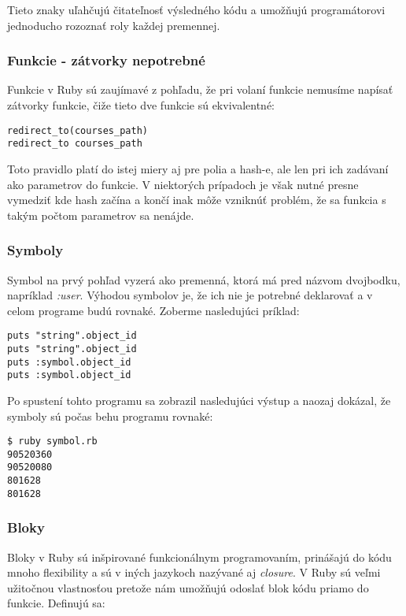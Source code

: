 Tieto znaky uľahčujú čitateľnosť výsledného kódu a umožňujú programátorovi jednoducho rozoznať roly každej premennej. \citep{web:rubylang}

\subsubsection{Funkcie - zátvorky nepotrebné }

Funkcie v Ruby sú zaujímavé z pohľadu, že pri volaní funkcie nemusíme napísať zátvorky funkcie, čiže tieto dve funkcie sú ekvivalentné:

\begin{verbatim}
redirect_to(courses_path)
redirect_to courses_path
\end{verbatim}

Toto pravidlo platí do istej miery aj pre polia a hash-e, ale len pri ich zadávaní ako parametrov do funkcie. V niektorých prípadoch je však nutné presne vymedziť kde hash začína a končí inak môže vzniknúť problém, že sa funkcia s takým počtom parametrov sa nenájde.

\subsubsection{Symboly}

Symbol na prvý pohľad vyzerá ako premenná, ktorá má pred názvom dvojbodku, napríklad \emph{:user}. Výhodou symbolov je, že ich nie je potrebné deklarovať a v celom programe budú rovnaké. Zoberme nasledujúci príklad:

\begin{verbatim}
puts "string".object_id
puts "string".object_id
puts :symbol.object_id
puts :symbol.object_id
\end{verbatim}

Po spustení tohto programu sa zobrazil nasledujúci výstup a naozaj dokázal, že symboly sú počas behu programu rovnaké:

\begin{verbatim}
$ ruby symbol.rb
90520360
90520080
801628
801628
\end{verbatim}

\subsubsection{Bloky}

Bloky v Ruby sú inšpirované funkcionálnym programovaním, prinášajú do kódu mnoho flexibility a sú v iných jazykoch nazývané aj \emph{closure}. V Ruby sú veľmi užitočnou vlastnosťou pretože nám umožňujú odoslať blok kódu priamo do funkcie. Definujú sa:

